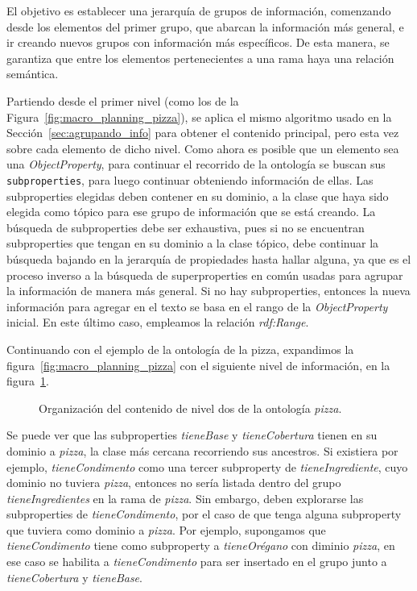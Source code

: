 El objetivo es establecer una jerarquía de grupos de información, comenzando desde los elementos del primer grupo, que abarcan la información más general, e ir creando nuevos grupos con información más específicos. De esta manera, se garantiza que entre los elementos pertenecientes a una rama haya una relación semántica.

Partiendo desde el primer nivel (como los de la Figura~\ref{fig:macro_planning_pizza}), se aplica el mismo algoritmo usado en la Sección~\ref{sec:agrupando_info} para obtener el contenido principal, pero esta vez sobre cada elemento de dicho nivel. Como ahora es posible que un elemento sea una \emph{ObjectProperty}, para continuar el recorrido de la ontología se buscan sus {\tt subproperties}, para luego continuar obteniendo información de ellas. Las subproperties elegidas deben contener en su dominio, a la clase que haya sido elegida como tópico para ese grupo de información que se está creando. La búsqueda de subproperties debe ser exhaustiva, pues si no se encuentran subproperties que tengan en su dominio a la clase tópico, debe continuar la búsqueda bajando en la jerarquía de propiedades hasta hallar alguna, ya que es el proceso inverso a la búsqueda de superproperties en común usadas para agrupar la información de manera más general. Si no hay subproperties, entonces la nueva información para agregar en el texto se basa en el rango de la \emph{ObjectProperty} inicial. En este último caso, empleamos la relación \emph{rdf:Range}.

Continuando con el ejemplo de la ontología de la pizza, expandimos la figura~\ref{fig:macro_planning_pizza} con el siguiente nivel de información, en la figura~\ref{fig:macro_planning_pizza_n2}. 
\begin{figure}[H]
\centering
\begin{minipage}[c]{0.7\textwidth}
{\footnotesize 
{}}
\caption{Organización del contenido de nivel dos de la ontología \emph{pizza}.}
\label{fig:macro_planning_pizza_n2}
\end{minipage}
\end{figure}

Se puede ver que las subproperties \emph{tieneBase} y \emph{tieneCobertura} tienen en su dominio a \emph{pizza}, la clase más cercana recorriendo sus ancestros. Si existiera por ejemplo, \emph{tieneCondimento} como una tercer subproperty de \emph{tieneIngrediente}, cuyo dominio no tuviera \emph{pizza}, entonces no sería listada dentro del grupo \emph{tieneIngredientes} en la rama de \emph{pizza}. Sin embargo, deben explorarse las subproperties de \emph{tieneCondimento}, por el caso de que tenga alguna subproperty que tuviera como dominio a \emph{pizza}. Por ejemplo, supongamos que \emph{tieneCondimento} tiene como subproperty a \emph{tieneOrégano} con diminio \emph{pizza}, en ese caso se habilita a \emph{tieneCondimento} para ser insertado en el grupo junto a  \emph{tieneCobertura} y \emph{tieneBase}.  

